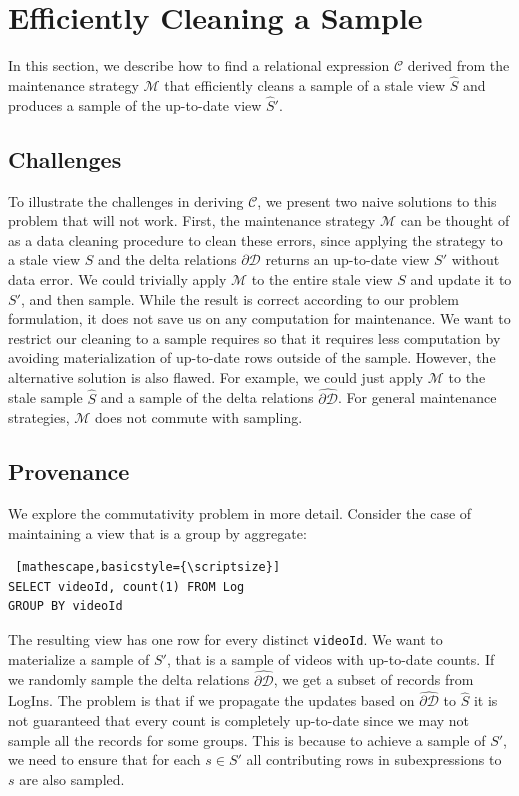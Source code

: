 \section{Efficiently Cleaning a Sample} \label{sampling}
In this section, we describe how to find a relational expression $\mathcal{C}$ derived from the maintenance strategy $\mathcal{M}$ that
efficiently cleans a sample of a stale view $\widehat{S}$ and produces a sample of the up-to-date view $\widehat{S}'$.

\subsection{Challenges}
To illustrate the challenges in deriving $\mathcal{C}$, we present two naive solutions to this problem that will not work. 
First, the maintenance strategy $\mathcal{M}$ can be thought of as a data cleaning procedure to clean these errors, since applying the strategy to a stale view $S$ and the delta relations $\partial \mathcal{D}$ returns an up-to-date view $S'$ without data error.
We could trivially apply $\mathcal{M}$ to the entire stale view $S$ and update it to $S'$, and then sample.
While the result is correct according to our problem formulation, it does not save us on any computation for maintenance.
We want to restrict our cleaning to a sample requires so that it requires less computation by avoiding materialization of up-to-date rows outside of the sample. However, the alternative solution is also flawed. 
For example, we could just apply $\mathcal{M}$ to the stale sample $\widehat{S}$ and a sample of the delta relations $\widehat{\partial \mathcal{D}}$. 
For general maintenance strategies, $\mathcal{M}$ does not commute with sampling. 

\subsection{Provenance}
\label{lin}
We explore the commutativity problem in more detail.
Consider the case of maintaining a view that is a group by aggregate:
\begin{lstlisting} [mathescape,basicstyle={\scriptsize}]
SELECT videoId, count(1) FROM Log
GROUP BY videoId
\end{lstlisting}
The resulting view has one row for every distinct \texttt{videoId}.
We want to materialize a sample of $S'$, that is a sample of videos with up-to-date counts.
If we randomly sample the delta relations $\widehat{\partial \mathcal{D}}$, we get a subset of records from LogIns.
The problem is that if we propagate the updates based on $\widehat{\partial \mathcal{D}}$ to $\widehat{S}$ it is not guaranteed that 
every count is completely up-to-date since we may not sample all the records for some groups.
This is because to achieve a sample of $S'$, we need to ensure that for each $s \in S'$ all contributing rows in subexpressions to $s$ are also sampled. 

